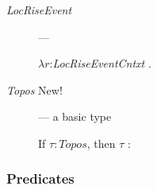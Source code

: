 \begin{description}
 \item[\textnormal{\textit{LocRiseEvent}}] ---

   $\lambda
r$:\textit{LocRiseEventCntxt} .\\  
\hspace*{2em}

      
    \item[\textnormal{\textit{Topos}} New!] --- a basic type

      If $\tau:\textit{Topos}$, then $\tau$ :  

                       


\end{description}

  \subsubsection{Predicates} 

